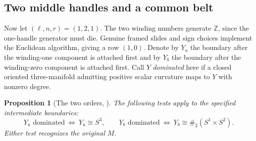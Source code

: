 \documentclass[11pt,letterpaper]{article}
\numberwithin{equation}{section}
\newtheorem{proposition}{Proposition}[section]
\newcommand{\Z}{\mathbb Z}
\begin{document}
\subsection{Two middle handles and a common belt}

Now let \((\ell,n,r)=(1,2,1)\). The two winding numbers generate
\(\Z\), since the one-handle generator must die. Genuine framed
slides and sign choices implement the Euclidean algorithm, giving
a row \((1,0)\). Denote by \(Y_a\) the boundary after the winding-one
component is attached first and by \(Y_b\) the boundary after the
winding-zero component is attached first. Call \(Y\) \emph{dominated}
here if a closed oriented three-manifold admitting positive scalar
curvature maps to \(Y\) with nonzero degree.

\begin{proposition}[The two orders, \cite{Baker2026HandleCuts}]
The following tests apply to the specified intermediate boundaries:
\[
  Y_a\text{ dominated}\ \Longleftrightarrow\ Y_a\cong S^3,
  \qquad
  Y_b\text{ dominated}\ \Longleftrightarrow\
       Y_b\cong\#_2(S^1\times S^2).
\]
Either test recognizes the original \(M\).
\end{proposition}
\end{document}
